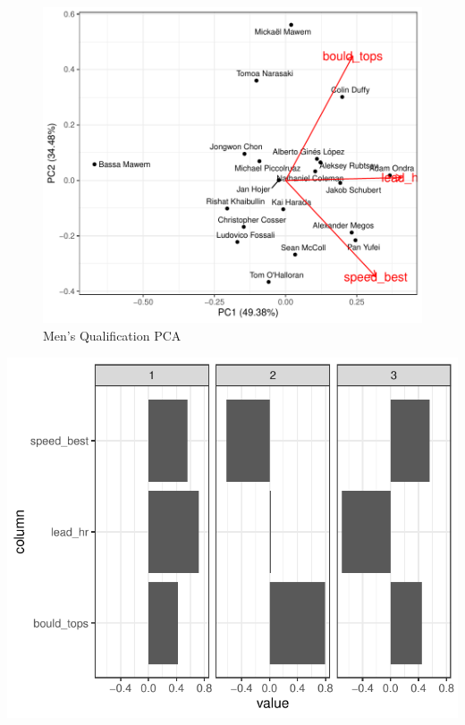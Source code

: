 \documentclass[12pt]{article}
\begin{document}
\begin{figure}

{\centering \includegraphics{draft_files/figure-latex/unnamed-chunk-25-1} 

}

\caption{Men's Qualification PCA}\label{fig:unnamed-chunk-25}
\end{figure}

\begin{center}\includegraphics{draft_files/figure-latex/unnamed-chunk-26-1} \end{center}
\end{document}
